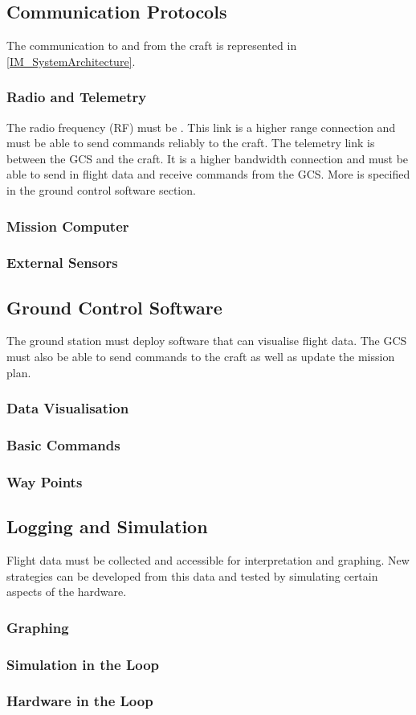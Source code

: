 		\subsection{Communication Protocols}
		The communication to and from the craft is represented in \ref{IM_SystemArchitecture}.
			\subsubsection{Radio and Telemetry}
			The radio frequency (RF) must be . This link is a higher range connection and must be able to send commands reliably to the craft. 
			The telemetry link is between the GCS and the craft. It is a higher bandwidth connection and must be able to send in flight data and receive commands from the GCS. More is specified in the ground control software section.
			\subsubsection{Mission Computer}
			\subsubsection{External Sensors}
		\subsection{Ground Control Software}
		The ground station must deploy software that can visualise flight data. The GCS must also be able to send commands to the craft as well as update the mission plan.
			\subsubsection{Data Visualisation}
			\subsubsection{Basic Commands}
			\subsubsection{Way Points}
		\subsection{Logging and Simulation}
		Flight data must be collected and accessible for interpretation and graphing. New strategies can be developed from this data and tested by simulating certain aspects of the hardware.
			\subsubsection{Graphing}
			\subsubsection{Simulation in the Loop}
			\subsubsection{Hardware in the Loop}			
		







